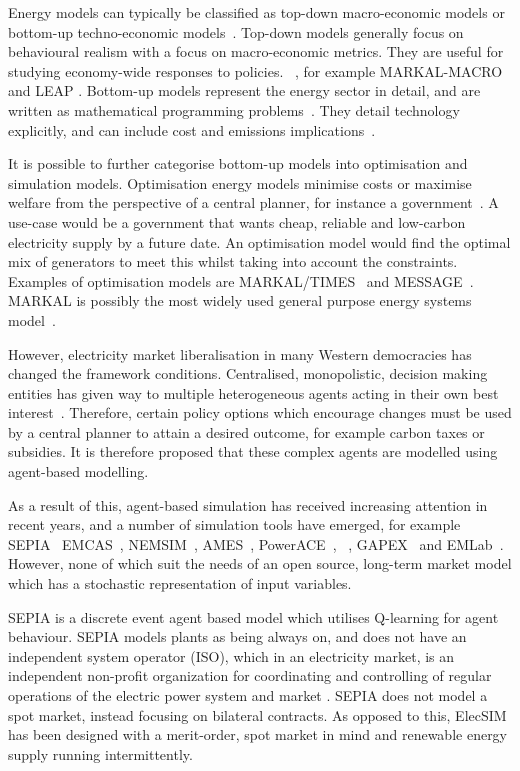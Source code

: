 Energy models can typically be classified as top-down macro-economic models or bottom-up techno-economic models~\cite{Bohringer1998}. Top-down models generally focus on behavioural realism with a focus on macro-economic metrics. They are useful for studying economy-wide responses to policies. ~\cite{Hall2016}, for example MARKAL-MACRO \cite{Fishbone1981} and LEAP \cite{Heaps2016}. Bottom-up models represent the energy sector in detail, and are written as mathematical programming problems~\cite{Gargiulo2013}. They detail technology explicitly, and can include cost and emissions implications~\cite{Hall2016}.

It is possible to further categorise bottom-up models into optimisation and simulation models. Optimisation energy models minimise costs or maximise welfare from the perspective of a central planner, for instance a government~\cite{Keles2017}. A use-case would be a government that wants cheap, reliable and low-carbon electricity supply by a future date. An optimisation model would find the optimal mix of generators to meet this whilst taking into account the constraints. Examples of optimisation models are MARKAL/TIMES~\cite{Fishbone1981} and MESSAGE~\cite{Schrattenholzer1981}. MARKAL is possibly the most widely used general purpose energy systems model~\cite{Pfenninger2014}.

However, electricity market liberalisation in many Western democracies has changed the framework conditions. Centralised, monopolistic, decision making entities has given way to multiple heterogeneous agents acting in their own best interest~\cite{Most2010}. Therefore, certain policy options which encourage changes must be used by a central planner to attain a desired outcome, for example carbon taxes or subsidies. It is therefore proposed that these complex agents are modelled using agent-based modelling.

As a result of this, agent-based simulation has received increasing attention in recent years, and a number of simulation tools have emerged, for example SEPIA~\cite{Harp2000} EMCAS~\cite{Conzelmann}, NEMSIM~\cite{Batten2006}, AMES~\cite{Sun2007}, PowerACE~\cite{Rothengatter2007}, ~\cite{Praca2003}, GAPEX~\cite{Cincotti2013} and  EMLab~\cite{Chappin2017}. However, none of which suit the needs of an open source, long-term market model which has a stochastic representation of input variables.

SEPIA \cite{Harp2000} is a discrete event agent based model which utilises Q-learning for agent behaviour. SEPIA models plants as being always on, and does not have an independent system operator (ISO), which in an electricity market, is an independent non-profit organization for coordinating and controlling of regular operations of the electric power system and market  \cite{Zhou2007}. SEPIA does not model a spot market, instead focusing on bilateral contracts. As opposed to this, ElecSIM has been designed with a merit-order, spot market in mind and renewable energy supply running intermittently.

